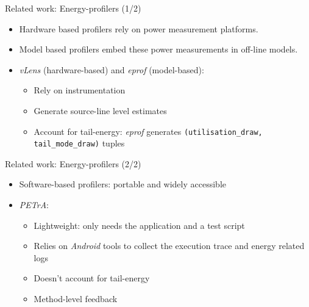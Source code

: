 %
\begin{frame}{Related work: Energy-profilers (1/2)}
\begin{itemize}
\item \alert{Hardware based} profilers rely on power measurement platforms.
\item \alert{Model based} profilers embed these power measurements in off-line models.
\item \textit{vLens} (hardware-based) and \textit{eprof} (model-based):
\begin{itemize}
\item Rely on instrumentation
\item Generate \alert{source-line level estimates}
\item Account for \alert{tail-energy}: \textit{eprof} generates \texttt{(utilisation\_draw, 
tail\_mode\_draw)} tuples
\end{itemize}
\end{itemize}
\end{frame}
%
\begin{frame}{Related work: Energy-profilers (2/2)}
\begin{itemize}
\item \alert{Software-based} profilers: portable and widely accessible
\item \textit{PETrA}:
\begin{itemize}
\item Lightweight: only needs the application and a test script
\item \alert{Relies on \textit{Android}} tools to collect the execution trace and energy related logs
\item Doesn't account for tail-energy
\item \alert{Method-level} feedback
\end{itemize}
\end{itemize}
\end{frame}
